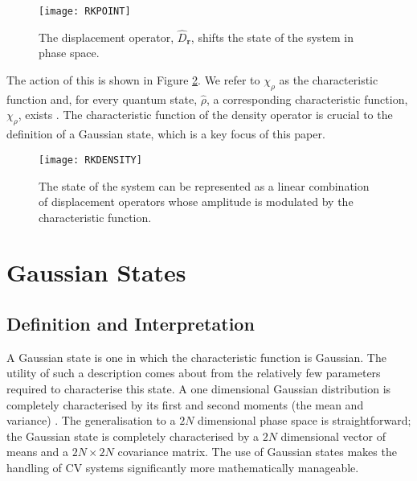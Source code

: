 \documentclass[11pt,a4paper]{article}
\numberwithin{equation}{section}
\begin{document}
	\begin{figure} [h]
		\centering
		\texttt{[image: RKPOINT]}
		\caption[Action of the displacement operator]{The displacement operator, $\hat{D}_\mathbf{r}$, shifts the state of the system in phase space.}
		\label{fig:RKPOINT}
	\end{figure}
	
	The action of this is shown in Figure \ref{fig:RKDENSITY}. We refer to $\chi_\rho$ as the characteristic function and, for every quantum state, $\hat{\rho}$, a corresponding characteristic function, $\chi_\rho$, exists \cite{Hillery84}. The characteristic function of the density operator is crucial to the definition of a Gaussian state, which is a key focus of this paper.
	
	\begin{figure} [h]
		\centering
		\texttt{[image: RKDENSITY]}
		\caption[A Gaussian State representation]{The state of the system can be represented as a linear combination of displacement operators whose amplitude is modulated by the characteristic function.}
		\label{fig:RKDENSITY}
	\end{figure}
	
	
	\section{Gaussian States}
	\label{sec:gaussian} 
	\subsection{Definition and Interpretation}
	
	A Gaussian state is one in which the characteristic function is Gaussian. The utility of such a description comes about from the relatively few parameters required to characterise this state. A one dimensional Gaussian distribution is completely characterised by its first and second moments (the mean and variance) \cite{Ribeiro}. The generalisation to a $2N$ dimensional phase space is straightforward; the Gaussian state is completely characterised by a $2N$ dimensional vector of means and a $2N\times2N$ covariance matrix. The use of Gaussian states makes the handling of CV systems significantly more mathematically manageable.
	
\end{document}
